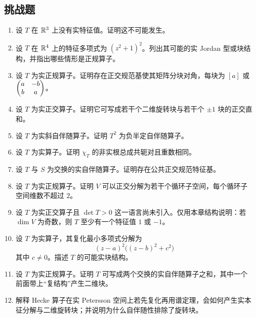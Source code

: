 \subsection*{挑战题}
\begin{enumerate}[resume, label=\textbf{\arabic*.}, leftmargin=*, itemsep=0.5em]
\item \hard 设 $T$ 在 $\mathbb{R}^3$ 上没有实特征值。证明这不可能发生。
\item \hard 设 $T$ 在 $\mathbb{R}^4$ 上的特征多项式为 $(z^2+1)^2$。列出其可能的实 Jordan 型或块结构，并指出哪些情形是正规算子。
\item \hard 设 $T$ 为实正规算子。证明存在正交规范基使其矩阵分块对角，每块为 $[a]$ 或 $\begin{pmatrix} a&-b\\b&a \end{pmatrix}$。
\item \hard 设 $T$ 为实正交算子。证明它可写成若干个二维旋转块与若干个 $\pm1$ 块的正交直和。
\item \hard 设 $T$ 为实斜自伴随算子。证明 $T^2$ 为负半定自伴随算子。
\item \hard 设 $T$ 为实算子。证明 $\chi_T$ 的非实根总成共轭对且重数相同。
\item \hard 设 $T$ 与 $S$ 为交换的实自伴随算子。证明存在公共正交规范特征基。
\item \hard 设 $T$ 为实正规算子。证明 $V$ 可以正交分解为若干个循环子空间，每个循环子空间维数不超过 $2$。
\item \hard 设 $T$ 为实正交算子且 $\det T>0$ 这一语言尚未引入。仅用本章结构说明：若 $\dim V$ 为奇数，则 $T$ 至少有一个特征值 $1$ 或 $-1$。
\item \hard 设 $T$ 为实算子，其复化最小多项式分解为
\[
(z-a)^2\big((z-b)^2+c^2\big)
\]
其中 $c\neq0$。描述 $T$ 的可能实块结构。
\item \hard 设 $T$ 为实正规算子。证明 $T$ 可写成两个交换的实自伴随算子之和，其中一个前面带上“复结构”产生二维块。
\item \hard 解释 Hecke 算子在实 Petersson 空间上若先复化再用谱定理，会如何产生实本征分解与二维旋转块；并说明为什么自伴随性排除了旋转块。
\end{enumerate}

